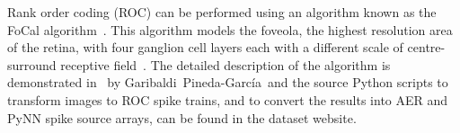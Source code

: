 %
Rank order coding (ROC) can be performed using an algorithm known as the
{FoCal algorithm~\cite{sen2009evaluating}}.
This algorithm models the foveola, the highest resolution area of the retina, with four ganglion cell layers each with a different scale of centre-surround receptive field~\cite{kolb2003retina}.
The detailed description of the algorithm is demonstrated in~\cite{liu2016bench} by Garibaldi~Pineda-Garc\'ia\, and the source Python scripts to transform images to ROC spike trains, and to convert the results into AER and PyNN spike source arrays, can be found in the dataset website.
%
%
%
